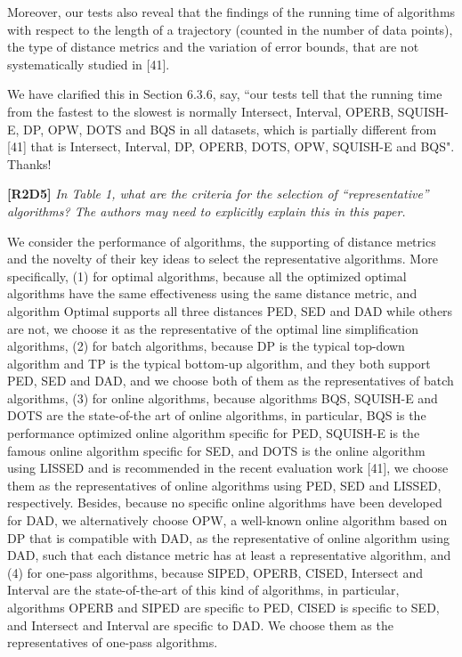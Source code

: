 \documentclass{letter}
\begin{document}
Moreover, our tests also reveal that the findings of the running time of algorithms with respect to the length of a trajectory (counted in the number of data points), the type of distance metrics and the variation of error bounds, that are not systematically studied in [41].



We have clarified this in Section 6.3.6, say, ``our tests tell that the running time from the fastest to the slowest is normally Intersect, Interval, OPERB, SQUISH-E, DP, OPW, DOTS and BQS in all datasets, which is partially different from [41] that is Intersect, Interval, DP, OPERB, DOTS, OPW, SQUISH-E and BQS". Thanks!




\textbf{[R2D5]} \emph{In Table 1, what are the criteria for the selection of ``representative'' algorithms? The authors may need to explicitly explain this in this paper.}

We consider the performance of algorithms, the supporting of distance metrics and the novelty of their key ideas to select the representative algorithms. More specifically,
(1) for optimal algorithms, {because all the optimized optimal algorithms have the same effectiveness using the same distance metric, and algorithm Optimal supports all three distances PED, SED and DAD while others are not, we choose it as the representative of the optimal line simplification algorithms,}
%
(2) for batch algorithms, {because DP is the typical top-down algorithm and TP is the typical bottom-up algorithm, and they both support PED, SED and DAD, and we choose  both of them as the representatives of batch algorithms,}
%
(3) for online algorithms, because algorithms BQS, SQUISH-E and DOTS are the state-of-the art of online algorithms, in particular, BQS is the performance optimized online algorithm specific for PED, SQUISH-E is the famous online algorithm specific for SED, and {DOTS is the online algorithm using LISSED and is recommended in the recent evaluation work [41]}, we choose them as the representatives of online algorithms using PED, SED and {LISSED}, respectively. Besides, because no specific online algorithms have been developed for DAD, we alternatively choose OPW, a well-known online algorithm based on DP that is compatible with DAD, as the representative of online algorithm using DAD, such that each distance metric has at least a representative algorithm, and
%
(4) for one-pass algorithms, because SIPED, OPERB, CISED, Intersect and Interval are the state-of-the-art of this kind of algorithms, in particular, algorithms OPERB and SIPED are specific to PED, CISED is specific to SED, and Intersect and Interval are specific to DAD. We choose them as the representatives of one-pass algorithms.
\end{document}
